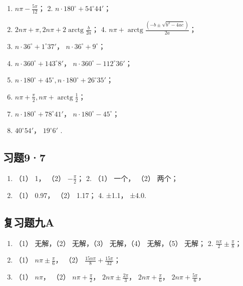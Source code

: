\begin{enumerate}
\item
  \(n\pi - \frac{5\pi}{12}\)； 2. \(n \cdot 180^\circ + 54^\circ 44'\)；
\item
  \(2n\pi + \pi, 2n\pi + 2\operatorname{arctg} \frac{b}{2a}\)； 4.
  \(n\pi + \operatorname{arctg} \frac{(-b \pm \sqrt{b^2 - 4ac})}{2a}\)；
\item
  \(n \cdot 36^{\circ} + 1^{\circ}37'\)，
  \(n \cdot 36^{\circ} + 9^{\circ}\)；
\item
  \(n \cdot 360^{\circ} + 143^{\circ}8'\)，
  \(n \cdot 360^{\circ} - 112^{\circ}36'\)；
\item
  \(n \cdot 180^{\circ} + 45^{\circ}, n \cdot 180^{\circ} + 26^{\circ}35'\)；
\item
  \(n\pi + \frac{\pi}{2}, n\pi + \operatorname{arctg} \frac{1}{2}\)；
\item
  \(n \cdot 180^{\circ} + 78^{\circ}41'\)，
  \(n \cdot 180^{\circ} - 45^{\circ}\)；
\item
  \(40^{\circ}54'\)， \(19^{\circ}6'\) .
\end{enumerate}

\subsection{习题9·7}

\begin{enumerate}
\item
  （1） 1， （2） \(-\frac{\pi}{2}\)； 2. （1） 一个， （2） 两个；
\item
  （1） 0.97， （2） 1.17； 4. ±1.1， ±4.0.
\end{enumerate}

\subsection{复习题九A}

\begin{enumerate}
\item
  （1） 无解，（2） 无解，（3） 无解，（4） 无解，（5） 无解； 2.
  \(\frac{n\pi}{2} \pm \frac{\pi}{8}\)；
\item
  （1） \(n\pi \pm \frac{\pi}{6}\)， （2）
  \(\frac{15n\pi}{8} + \frac{15\pi}{32}\)；
\item
  （1） \(n\pi\)， （2） \(n\pi + \frac{\pi}{2}\)，
  \(2n\pi \pm \frac{2\pi}{3}\)， \(2n\pi + \frac{\pi}{6}\)，
  \(2n\pi + \frac{5\pi}{6}\)，
\end{enumerate}


